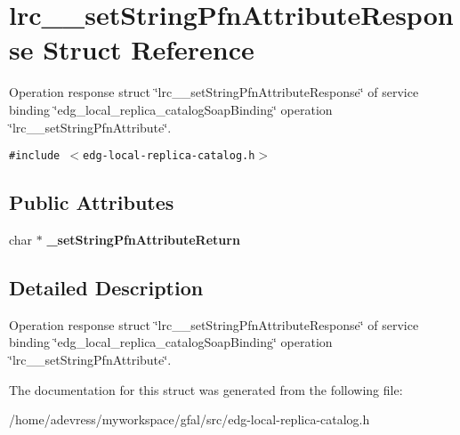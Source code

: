 \section{lrc\_\-\_\-set\-String\-Pfn\-Attribute\-Response Struct Reference}
\label{structlrc____setStringPfnAttributeResponse}
Operation response struct \char`\"{}lrc\_\-\_\-set\-String\-Pfn\-Attribute\-Response\char`\"{} of service binding \char`\"{}edg\_\-local\_\-replica\_\-catalog\-Soap\-Binding\char`\"{} operation \char`\"{}lrc\_\-\_\-set\-String\-Pfn\-Attribute\char`\"{}.  


{\tt \#include $<$edg-local-replica-catalog.h$>$}

\subsection*{Public Attributes}
\begin{CompactItemize}
\item 
char $\ast$ \textbf{\_\-set\-String\-Pfn\-Attribute\-Return}\label{structlrc____setStringPfnAttributeResponse_c1343cc97c43a9e6294f22e527a3d481}

\end{CompactItemize}


\subsection{Detailed Description}
Operation response struct \char`\"{}lrc\_\-\_\-set\-String\-Pfn\-Attribute\-Response\char`\"{} of service binding \char`\"{}edg\_\-local\_\-replica\_\-catalog\-Soap\-Binding\char`\"{} operation \char`\"{}lrc\_\-\_\-set\-String\-Pfn\-Attribute\char`\"{}. 



The documentation for this struct was generated from the following file:\begin{CompactItemize}
\item 
/home/adevress/myworkspace/gfal/src/edg-local-replica-catalog.h\end{CompactItemize}
